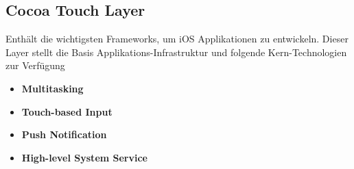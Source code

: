 \subsection{Cocoa Touch Layer}
\label{sec:CocoaTouchLayer}
Enthält die wichtigsten Frameworks, um iOS Applikationen zu entwickeln. Dieser
Layer stellt die Basis Applikations-Infrastruktur und folgende Kern-Technologien zur Verfügung
\begin{multicols}{2}
	\begin{itemize}
		\item \textbf{Multitasking}
		\item \textbf{Touch-based Input}
		\item \textbf{Push Notification}
		\item \textbf{High-level System Service}	
	\end{itemize}
	\end{multicols}
